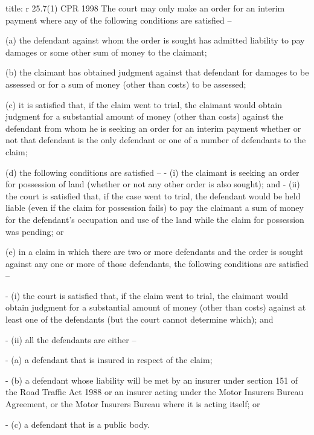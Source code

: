 \documentclass[
]{article}
\newenvironment{Shaded}{}{}
\newcommand{\NormalTok}[1]{#1}
\begin{document}
\begin{Shaded}
\begin{Highlighting}[]
\NormalTok{title: r 25.7(1) CPR 1998}
\NormalTok{The court may only make an order for an interim payment where any of the following conditions are satisfied –}

\NormalTok{(a) the defendant against whom the order is sought has admitted liability to pay damages or some other sum of money to the claimant;}

\NormalTok{(b) the claimant has obtained judgment against that defendant for damages to be assessed or for a sum of money (other than costs) to be assessed;}

\NormalTok{(c) it is satisfied that, if the claim went to trial, the claimant would obtain judgment for a substantial amount of money (other than costs) against the defendant from whom he is seeking an order for an interim payment whether or not that defendant is the only defendant or one of a number of defendants to the claim;}

\NormalTok{(d) the following conditions are satisfied –}
\NormalTok{{-} (i) the claimant is seeking an order for possession of land (whether or not any other order is also sought); and}
\NormalTok{{-} (ii) the court is satisfied that, if the case went to trial, the defendant would be held liable (even if the claim for possession fails) to pay the claimant a sum of money for the defendant’s occupation and use of the land while the claim for possession was pending; or}

\NormalTok{(e) in a claim in which there are two or more defendants and the order is sought against any one or more of those defendants, the following conditions are satisfied –}

\NormalTok{{-} (i) the court is satisfied that, if the claim went to trial, the claimant would obtain judgment for a substantial amount of money (other than costs) against at least one of the defendants (but the court cannot determine which); and}

\NormalTok{{-} (ii) all the defendants are either –}

\NormalTok{    {-} (a) a defendant that is insured in respect of the claim;}
    
\NormalTok{    {-} (b) a defendant whose liability will be met by an insurer under section 151 of the Road Traffic Act 1988 or an insurer acting under the Motor Insurers Bureau Agreement, or the Motor Insurers Bureau where it is acting itself; or}
    
\NormalTok{    {-} (c) a defendant that is a public body.}
\end{Highlighting}
\end{Shaded}
\end{document}
